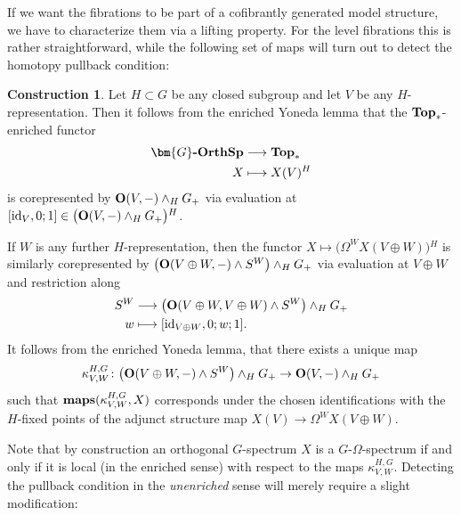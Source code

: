 \documentclass[reqno]{memo-l}
\theoremstyle{mythm}
\theoremstyle{definition}
\newtheorem{constr}[thm]{Construction}
\numberwithin{equation}{section}
\newcommand{\cat}[1]{\textbf{\textup{#1}}}
\newcommand{\maps}{\cat{maps}}
\newcommand{\id}{\textup{id}}
\let\smashp=\wedge
\newcommand{\Gosp}[1]{\cat{$\bm{#1}$-OrthSp}}
\begin{document}
If we want the fibrations to be part of a cofibrantly generated model structure, we have to characterize them via a lifting property. For the level fibrations this is rather straightforward, while the following set of maps will turn out to detect the homotopy pullback condition:

\begin{constr}\label{constr:generating-equiv-acyclic}
    Let $H\subset G$ be any closed subgroup and let $V$ be any $H$-representation. Then it follows from the enriched Yoneda lemma that the $\cat{Top}_*$-enriched functor 
    \begin{align*} 
        \Gosp{G} &\longrightarrow \cat{Top}_*\\ 
        X&\longmapsto X(V)^H
    \end{align*} 
    is corepresented by $\cat{O}(V,-)\smashp_HG_+$ via evaluation at $[\id_V,0;1]\in\big(\cat{O}(V,-)\smashp_HG_+\big){}^H$. 
    
    If $W$ is any further $H$-representation, then the functor $X\mapsto\big(\Omega^WX(V\oplus W)\big){}^H$ is similarly corepresented by $\big(\cat{O}(V\oplus W,-)\smashp S^W\big)\smashp_H G_+$ via evaluation at $V\oplus W$ and restriction along
    \begin{align*}
        S^W&\longrightarrow\big(\cat{O}(V\oplus W,V\oplus W)\smashp S^W\big)\smashp_H G_+\\
        w&\longmapsto [\id_{V\oplus W},0;w;1].
    \end{align*}
    It follows from the enriched Yoneda lemma, that there exists a unique map
    \[
        \kappa_{V,W}^{H,G}\colon \big(\cat{O}(V\oplus W,-)\smashp S^W\big)\smashp_H G_+\to\cat{O}(V,-)\smashp_HG_+
    \] 
    such that $\maps(\kappa_{V,W}^{H,G},X)$ corresponds under the chosen identifications with the $H$-fixed points of the adjunct structure map $X(V)\to\Omega^WX(V\oplus W)$.
\end{constr}

Note that by construction an orthogonal $G$-spectrum $X$ is a $G$-$\Omega$-spectrum if and only if it is local (in the enriched sense) with respect to the maps $\kappa_{V,W}^{H,G}$. Detecting the pullback condition in the \emph{unenriched} sense will merely require a slight modification:
\end{document}
